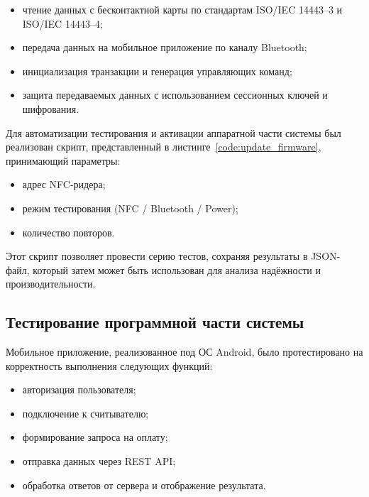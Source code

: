 \begin{itemize}
	\item чтение данных с бесконтактной карты по стандартам ISO/IEC 14443--3 и ISO/IEC 14443--4;
	\item передача данных на мобильное приложение по каналу Bluetooth;
	\item инициализация транзакции и генерация управляющих команд;
	\item защита передаваемых данных с использованием сессионных ключей и шифрования.
\end{itemize}

Для автоматизации тестирования и активации аппаратной части системы был реализован скрипт, представленный в листинге~\ref{code:update_firmware}, принимающий параметры:

\begin{itemize}
	\item адрес NFC-ридера;
	\item режим тестирования (NFC / Bluetooth / Power);
	\item количество повторов.
\end{itemize}


\begin{singlespacing}
	\small
	\captionsetup{labelsep=endash, justification=raggedright, singlelinecheck=off}
	
\end{singlespacing}


Этот скрипт позволяет провести серию тестов, сохраняя результаты в JSON-файл, который затем может быть использован для анализа надёжности и производительности.



\subsection{Тестирование программной части системы}
Мобильное приложение, реализованное под ОС Android, было протестировано на корректность выполнения следующих функций:

\begin{itemize}
	\item авторизация пользователя;
	\item подключение к считывателю;
	\item формирование запроса на оплату;
	\item отправка данных через REST API;
	\item обработка ответов от сервера и отображение результата.
\end{itemize}


